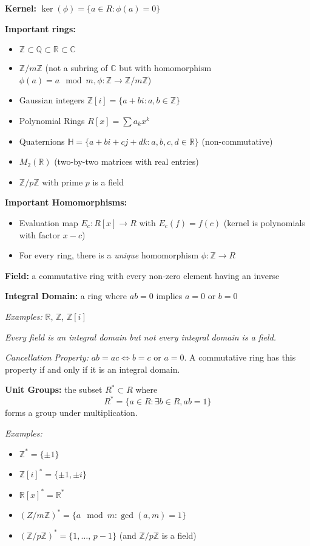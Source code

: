\documentclass[12pt]{article}
\newcommand{\R}{\mathbb{R}}
\newcommand{\Z}{\mathbb{Z}}
\begin{document}
\textbf{Kernel:} $\ker(\phi) = \{a \in R: \phi(a) = 0\}$

\textbf{Important rings:}
\begin{itemize}
    \item $\Z \subset \mathbb Q \subset \R \subset \mathbb C$ 
    \item $\Z/m\Z$ (not a subring of $\mathbb C$ but with homomorphism $\phi(a) = a \mod m, \phi: \Z \to \Z/m\Z$)
    \item Gaussian integers $\Z[i] = \{a + bi: a, b\in \Z\}$
    \item Polynomial Rings $R[x] = \sum a_k x^k$
    \item Quaternions $\mathbb H = \{a + bi + cj + dk: a, b, c, d \in \R\}$ (non-commutative)
    \item $M_2(\R)$ (two-by-two matrices with real entries)
    \item $\Z/p\Z$ with prime $p$ is a field 
\end{itemize}

\textbf{Important Homomorphisms:}
\begin{itemize}
    \item Evaluation map $E_c: R[x] \to R$ with $E_c(f) = f(c)$ (kernel is polynomials with factor $x - c$)
    \item For every ring, there is a \emph{unique} homomorphism $\phi: \Z \to R$
\end{itemize}

\textbf{Field:} a commutative ring with every non-zero element having an inverse 


\textbf{Integral Domain:} a ring where $ab = 0$ implies $a = 0$ or $b = 0$

\emph{Examples:} $\R$, $\Z$, $\Z[i]$

\emph{Every field is an integral domain but not every integral domain is a field. }

\emph{Cancellation Property:} $ab = ac \iff b=c \text{ or } a =0$. A commutative ring has this property if and only if it is an integral domain.

\textbf{Unit Groups:} the subset $R^* \subset R$ where 
\[R^* = \{a \in R: \exists b \in R, ab = 1\}\] 
forms a group under multiplication.

\emph{Examples:}
\begin{itemize}
    \item $\Z^* = \{\pm 1\}$
    \item $\Z[i]^* = \{\pm 1, \pm i\}$
    \item $\R[x]^* = \R^*$
    \item $(Z/m\Z)^* = \{a \mod m: \gcd(a, m) = 1\}$
    \item $(\Z/p\Z)^* = \{1, \dots,\, p - 1\}$ (and $\Z/p\Z$ is a field)
\end{itemize}
\end{document}
